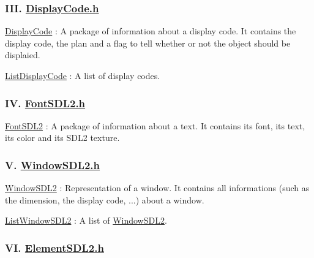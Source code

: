 \subsubsection*{I\+II. \hyperlink{DisplayCode_8h}{Display\+Code.\+h}}


\begin{DoxyEnumerate}
\item \hyperlink{structDisplayCode}{Display\+Code} \+: A package of information about a display code. It contains the display code, the plan and a flag to tell whether or not the object should be displaied.
\item \hyperlink{structListDisplayCode}{List\+Display\+Code} \+: A list of display codes.
\end{DoxyEnumerate}

\subsubsection*{IV. \hyperlink{FontSDL2_8h}{Font\+S\+D\+L2.\+h}}


\begin{DoxyEnumerate}
\item \hyperlink{structFontSDL2}{Font\+S\+D\+L2} \+: A package of information about a text. It contains its font, its text, its color and its S\+D\+L2 texture.
\end{DoxyEnumerate}

\subsubsection*{V. \hyperlink{WindowSDL2_8h}{Window\+S\+D\+L2.\+h}}


\begin{DoxyEnumerate}
\item \hyperlink{structWindowSDL2}{Window\+S\+D\+L2} \+: Representation of a window. It contains all informations (such as the dimension, the display code, ...) about a window.
\item \hyperlink{structListWindowSDL2}{List\+Window\+S\+D\+L2} \+: A list of \hyperlink{structWindowSDL2}{Window\+S\+D\+L2}.
\end{DoxyEnumerate}

\subsubsection*{VI. \hyperlink{ElementSDL2_8h}{Element\+S\+D\+L2.\+h}}


